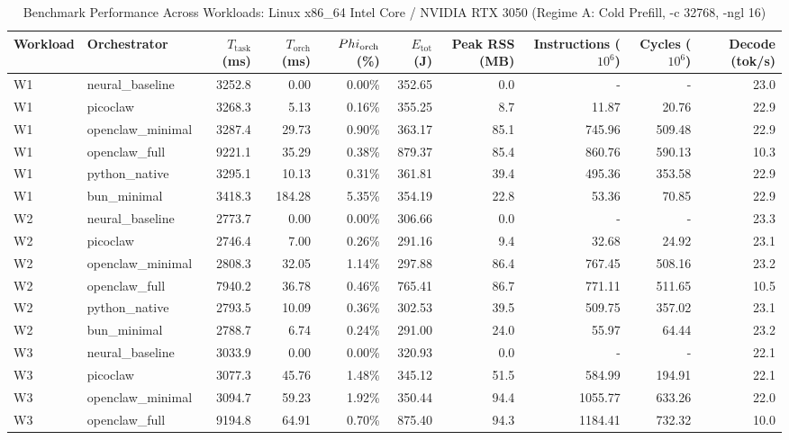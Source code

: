 \begin{table}[t]
\centering\small
\caption{Benchmark Performance Across Workloads: Linux x86_64 Intel Core / NVIDIA RTX 3050 (Regime A: Cold Prefill, -c 32768, -ngl 16)}
\label{tab:linux_master_summary}
\begin{tabular}{llrrrrrrrr}
\toprule
Workload & Orchestrator & $T_{\text{task}}$ (ms) & $T_{\text{orch}}$ (ms) & $\\Phi_{\text{orch}}$ (\%) & $E_{\text{tot}}$ (J) & Peak RSS (MB) & Instructions ($10^6$) & Cycles ($10^6$) & Decode (tok/s) \\
\midrule
W1 & neural\_baseline & 3252.8 & 0.00 & 0.00\% & 352.65 & 0.0 & - & - & 23.0 \\
W1 & picoclaw & 3268.3 & 5.13 & 0.16\% & 355.25 & 8.7 & 11.87 & 20.76 & 22.9 \\
W1 & openclaw\_minimal & 3287.4 & 29.73 & 0.90\% & 363.17 & 85.1 & 745.96 & 509.48 & 22.9 \\
W1 & openclaw\_full & 9221.1 & 35.29 & 0.38\% & 879.37 & 85.4 & 860.76 & 590.13 & 10.3 \\
W1 & python\_native & 3295.1 & 10.13 & 0.31\% & 361.81 & 39.4 & 495.36 & 353.58 & 22.9 \\
W1 & bun\_minimal & 3418.3 & 184.28 & 5.35\% & 354.19 & 22.8 & 53.36 & 70.85 & 22.9 \\
\midrule
W2 & neural\_baseline & 2773.7 & 0.00 & 0.00\% & 306.66 & 0.0 & - & - & 23.3 \\
W2 & picoclaw & 2746.4 & 7.00 & 0.26\% & 291.16 & 9.4 & 32.68 & 24.92 & 23.1 \\
W2 & openclaw\_minimal & 2808.3 & 32.05 & 1.14\% & 297.88 & 86.4 & 767.45 & 508.16 & 23.2 \\
W2 & openclaw\_full & 7940.2 & 36.78 & 0.46\% & 765.41 & 86.7 & 771.11 & 511.65 & 10.5 \\
W2 & python\_native & 2793.5 & 10.09 & 0.36\% & 302.53 & 39.5 & 509.75 & 357.02 & 23.1 \\
W2 & bun\_minimal & 2788.7 & 6.74 & 0.24\% & 291.00 & 24.0 & 55.97 & 64.44 & 23.2 \\
\midrule
W3 & neural\_baseline & 3033.9 & 0.00 & 0.00\% & 320.93 & 0.0 & - & - & 22.1 \\
W3 & picoclaw & 3077.3 & 45.76 & 1.48\% & 345.12 & 51.5 & 584.99 & 194.91 & 22.1 \\
W3 & openclaw\_minimal & 3094.7 & 59.23 & 1.92\% & 350.44 & 94.4 & 1055.77 & 633.26 & 22.0 \\
W3 & openclaw\_full & 9194.8 & 64.91 & 0.70\% & 875.40 & 94.3 & 1184.41 & 732.32 & 10.0 \\

\end{tabular}
\end{table}
